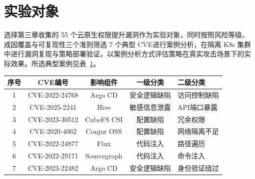 \section{实验对象}
选择第三章收集的 55 个云原生权限提升漏洞作为实验对象，同时按照风险等级、成因覆盖与可复现性三个准则筛选 7 个典型 CVE进行案例分析，在隔离 K8s 集群中进行漏洞复现与策略部署验证，以案例分析方式评估策略在真实攻击场景下的实际效果。所选典型案例见表~\ref{tab:chap5-cve-summary}。
\begin{table}[htb]
	\centering{}\label{tab:chap5-cve-summary}
	\noindent\renewcommand{\arraystretch}{1}
	\setlength{\tabcolsep}{4pt}
	\begin{tabularx}{0.92\linewidth}{c c c c X}
		\toprule
		\textbf{序号} & \textbf{CVE编号} & \textbf{影响组件} & \textbf{一级分类} & \textbf{二级分类} \\
		\midrule
		1 & CVE-2022-24768 & Argo CD & 安全逻辑缺陷 & 访问控制缺陷 \\
		2 & CVE-2025-2241 & Hive & 敏感信息泄露 & API端口暴露 \\
		3 & CVE-2023-30512 & CubeFS CSI & 配置缺陷 & 冗余权限 \\
		4 & CVE-2020-4062 & Conjur OSS & 配置缺陷 & 网络隔离不足 \\
		5 & CVE-2022-24877 & Flux & 代码注入 & 路径遍历 \\
		6 & CVE-2022-29171 & Sourcegraph & 代码注入 & 命令注入 \\
		7 & CVE-2023-22482 & Argo CD & 安全逻辑缺陷 & 身份验证绕过 \\
		\bottomrule
	\end{tabularx}
\end{table}

